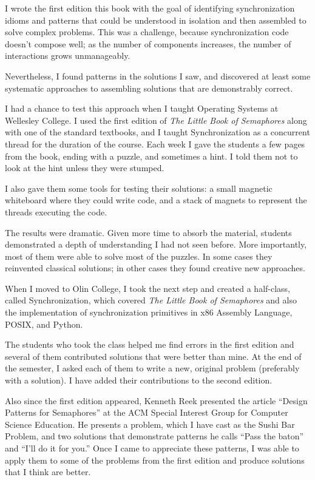 \documentclass{book}
\begin{document}
I wrote the first edition this book with the goal of identifying synchronization idioms and patterns that could be understood in isolation and then assembled to solve complex problems. This was a challenge, because synchronization code doesn't compose well; as the number of components increases, the number of interactions grows unmanageably.

Nevertheless, I found patterns in the solutions I saw, and discovered at least some systematic approaches to assembling solutions that are demonstrably correct.

I had a chance to test this approach when I taught Operating Systems at Wellesley College.  I used the first edition of {\em The Little Book of Semaphores} along with one of the standard textbooks, and I taught Synchronization as a concurrent thread for the duration of the course.  Each week I gave the students a few pages from the book, ending with a puzzle, and sometimes a hint.  I told them not to look at the hint unless they were stumped.

I also gave them some tools for testing their solutions: a small magnetic whiteboard where they could write code, and a stack of magnets to represent the threads executing the code.

The results were dramatic.  Given more time to absorb the material, students demonstrated a depth of understanding I had not seen before. More importantly, most of them were able to solve most of the puzzles. In some cases they reinvented classical solutions; in other cases they found creative new approaches.

When I moved to Olin College, I took the next step and created a half-class, called Synchronization, which covered {\em The Little Book of Semaphores} and also the implementation of synchronization primitives in x86 Assembly Language, POSIX, and Python.

The students who took the class helped me find errors in the first edition and several of them contributed solutions that were better than mine. At the end of the semester, I asked each of them to write a new, original problem (preferably with a solution). I have added their contributions to the second edition.

Also since the first edition appeared, Kenneth Reek presented the article ``Design Patterns for Semaphores'' at the ACM Special Interest Group for Computer Science Education. He presents a problem, which I have cast as the Sushi Bar Problem, and two solutions that demonstrate patterns he calls ``Pass the baton'' and ``I'll do it for you.'' Once I came to appreciate these patterns, I was able to apply them to some of the problems from the first edition and produce solutions that I think are better.
\end{document}
